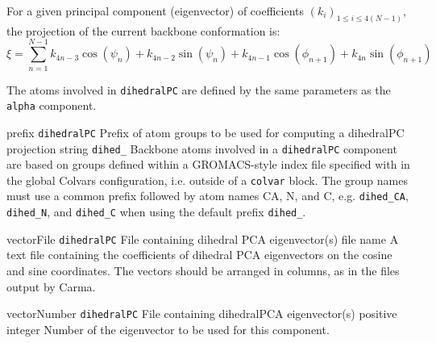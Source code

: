 For a given principal component (eigenvector) of coefficients
$(k_i)_{1 \leq i \leq 4(N-1)}$,
the projection of the current backbone conformation is:
\begin{equation}
\xi = \sum_{n=1}^{N-1} k_{4n-3} \cos(\psi_n) + k_{4n-2} \sin (\psi_n)
+ k_{4n-1} \cos (\phi_{n+1}) + k_{4n} \sin(\phi_{n+1})
\end{equation}

The atoms involved in \texttt{dihedralPC} are defined by the same parameters as the \texttt{alpha}
component.

\begin{cvcoptions}
  \item %
  \keydef
    {prefix}{%
      \texttt{dihedralPC}}{%
      Prefix of atom groups to be used for computing a dihedralPC projection}{%
      string}{%
      \texttt{dihed\_}}{%
    Backbone atoms involved in a \texttt{dihedralPC} component are based on groups defined within a
    GROMACS-style index file specified with  in the global
    Colvars configuration, i.e. outside of a \texttt{colvar} block.
    The group names must use a common prefix followed by atom names CA, N, and C, e.g. \texttt{dihed\_CA},
    \texttt{dihed\_N}, and \texttt{dihed\_C} when using the default prefix \texttt{dihed\_}.}


\item %
  \key
    {vectorFile}{%
    \texttt{dihedralPC}}{%
    File containing dihedral PCA eigenvector(s)}{%
    file name}{%
    A text file containing the coefficients of dihedral PCA eigenvectors on the
    cosine and sine coordinates. The vectors should be arranged in columns,
    as in the files output by Carma.\cite{Glykos2006}}

\item %
  \key
    {vectorNumber}{%
    \texttt{dihedralPC}}{%
    File containing dihedralPCA eigenvector(s)}{%
    positive integer}{%
    Number of the eigenvector to be used for this component.}
\end{cvcoptions}


